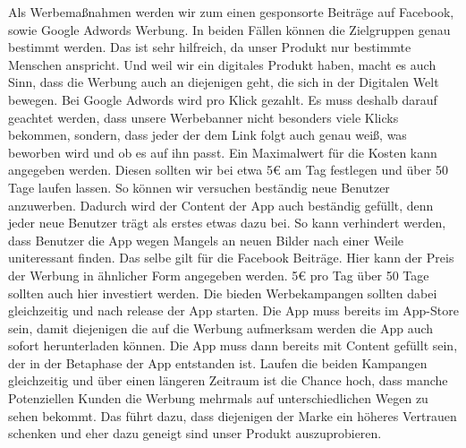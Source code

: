 Als Werbemaßnahmen werden wir zum einen gesponsorte Beiträge auf Facebook, sowie Google Adwords Werbung. In beiden Fällen können die Zielgruppen genau bestimmt werden. Das ist sehr hilfreich, da unser Produkt nur bestimmte Menschen anspricht. Und weil wir ein digitales Produkt haben, macht es auch Sinn, dass die Werbung auch an diejenigen geht, die sich in der Digitalen Welt bewegen.
Bei Google Adwords wird pro Klick gezahlt. Es muss deshalb darauf geachtet werden, dass unsere Werbebanner nicht besonders viele Klicks bekommen, sondern, dass jeder der dem Link folgt auch genau weiß, was beworben wird und ob es auf ihn passt. Ein Maximalwert für die Kosten kann angegeben werden. Diesen sollten wir bei etwa 5€ am Tag festlegen und über 50 Tage laufen lassen. So können wir versuchen beständig neue Benutzer anzuwerben. Dadurch wird der Content der App auch beständig gefüllt, denn jeder neue Benutzer trägt als erstes etwas dazu bei. So kann verhindert werden, dass Benutzer die App wegen Mangels an neuen Bilder nach einer Weile uniteressant finden.
Das selbe gilt für die Facebook Beiträge. Hier kann der Preis der Werbung in ähnlicher Form angegeben werden. 5€ pro Tag über 50 Tage sollten auch hier investiert werden.
Die bieden Werbekampangen sollten dabei gleichzeitig und nach release der App starten. Die App muss bereits im App-Store sein, damit diejenigen die auf die Werbung aufmerksam werden die App auch sofort herunterladen können. Die App muss dann bereits mit Content gefüllt sein, der in der Betaphase der App entstanden ist. Laufen die beiden Kampangen gleichzeitig und über einen längeren Zeitraum ist die Chance hoch, dass manche Potenziellen Kunden die Werbung mehrmals auf unterschiedlichen Wegen zu sehen bekommt. Das führt dazu, dass diejenigen der Marke ein höheres Vertrauen schenken und eher dazu geneigt sind unser Produkt auszuprobieren.